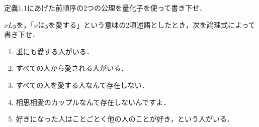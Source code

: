 \documentclass[11pt,a4paper]{jsarticle}
\begin{document}
\begin{exercise}
 定義1.1にあげた前順序の2つの公理を量化子を使って書き下せ．
\end{exercise}


\begin{exercise}
 $xLy$を，「$x$は$y$を愛する」という意味の2項述語としたとき，次を論理式によって書き下せ．
\begin{enumerate}
 \item 誰にも愛する人がいる．
 \item すべての人から愛される人がいる．
 \item すべての人を愛する人なんて存在しない．
 \item 相思相愛のカップルなんて存在しないんですよ．
 \item 好きになった人はことごとく他の人のことが好き，という人がいる．
\end{enumerate}

\end{exercise}
\end{document}
